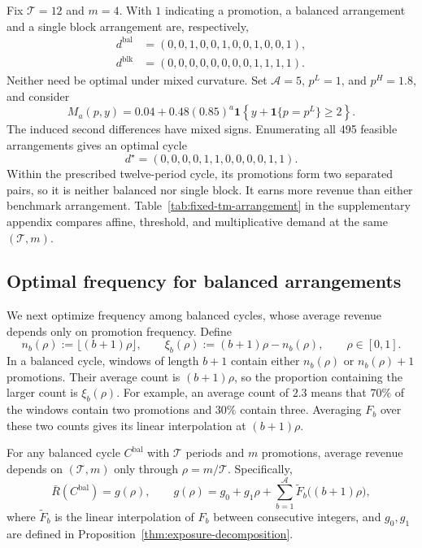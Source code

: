 \begin{example}
\label{ex:balanced-cycle}
Fix \(\mathcal T=12\) and \(m=4\). With \(1\) indicating a promotion, a balanced arrangement and a single block arrangement are, respectively,
\[
\begin{aligned}
 d^{\mathrm{bal}}&=(0,0,1,0,0,1,0,0,1,0,0,1),\\
 d^{\mathrm{blk}}&=(0,0,0,0,0,0,0,0,1,1,1,1).
\end{aligned}
\]
Neither need be optimal under mixed curvature. Set \(\mathcal A=5\), \(p^L=1\), and \(p^H=1.8\), and consider
\[
    M_a(p,y)=0.04+0.48(0.85)^a
    \mathbf1\!\left\{y+\mathbf1\{p=p^L\}\ge2\right\}.
\]
The induced second differences have mixed signs. Enumerating all 495 feasible arrangements gives an optimal cycle
\[
    d^\star=(0,0,0,0,1,1,0,0,0,0,1,1).
\]
Within the prescribed twelve-period cycle, its promotions form two separated pairs, so it is neither balanced nor single block. It earns more revenue than either benchmark arrangement. Table~\ref{tab:fixed-tm-arrangement} in the supplementary appendix compares affine, threshold, and multiplicative demand at the same \((\mathcal T,m)\).
\end{example}

\subsection{Optimal frequency for balanced arrangements}
\label{sec:general-frequency}

\begingroup\color{black}
We next optimize frequency among balanced cycles, whose average revenue depends only on promotion frequency. Define
\[
    n_b(\rho):=\lfloor(b+1)\rho\rfloor,\qquad
    \xi_b(\rho):=(b+1)\rho-n_b(\rho),\qquad \rho\in[0,1].
\]
In a balanced cycle, windows of length \(b+1\) contain either \(n_b(\rho)\) or \(n_b(\rho)+1\) promotions. Their average count is \((b+1)\rho\), so the proportion containing the larger count is \(\xi_b(\rho)\). For example, an average count of \(2.3\) means that \(70\%\) of the windows contain two promotions and \(30\%\) contain three. Averaging \(F_b\) over these two counts gives its linear interpolation at \((b+1)\rho\).
\par\endgroup

\begin{proposition}
    \label{thm:ratio}
For any balanced cycle \(C^{\mathrm{bal}}\) with \(\mathcal T\) periods and \(m\) promotions, average revenue depends on \((\mathcal T,m)\) only through \(\rho=m/\mathcal T\). Specifically,
\begin{equation}\label{eq:general-g-rho}
 \bar R(C^{\mathrm{bal}})=g(\rho),\qquad
 g(\rho)=g_0+g_1\rho+
          \sum_{b=1}^{\mathcal A}\widetilde F_b\bigl((b+1)\rho\bigr),
\end{equation}
where \(\widetilde F_b\) is the linear interpolation of \(F_b\) between consecutive integers, and \(g_0,g_1\) are defined in Proposition~\ref{thm:exposure-decomposition}.
\end{proposition}

